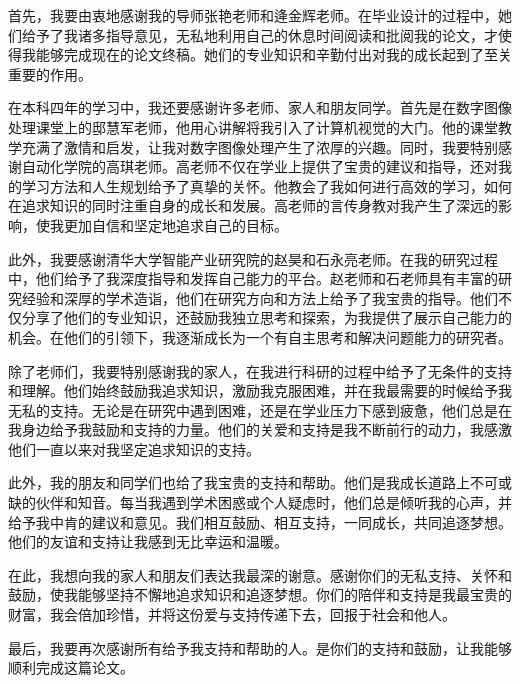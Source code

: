 \begin{acknowledgements}
首先，我要由衷地感谢我的导师张艳老师和逄金辉老师。在毕业设计的过程中，她们给予了我诸多指导意见，无私地利用自己的休息时间阅读和批阅我的论文，才使得我能够完成现在的论文终稿。她们的专业知识和辛勤付出对我的成长起到了至关重要的作用。

在本科四年的学习中，我还要感谢许多老师、家人和朋友同学。首先是在数字图像处理课堂上的邸慧军老师，他用心讲解将我引入了计算机视觉的大门。他的课堂教学充满了激情和启发，让我对数字图像处理产生了浓厚的兴趣。同时，我要特别感谢自动化学院的高琪老师。高老师不仅在学业上提供了宝贵的建议和指导，还对我的学习方法和人生规划给予了真挚的关怀。他教会了我如何进行高效的学习，如何在追求知识的同时注重自身的成长和发展。高老师的言传身教对我产生了深远的影响，使我更加自信和坚定地追求自己的目标。

此外，我要感谢清华大学智能产业研究院的赵昊和石永亮老师。在我的研究过程中，他们给予了我深度指导和发挥自己能力的平台。赵老师和石老师具有丰富的研究经验和深厚的学术造诣，他们在研究方向和方法上给予了我宝贵的指导。他们不仅分享了他们的专业知识，还鼓励我独立思考和探索，为我提供了展示自己能力的机会。在他们的引领下，我逐渐成长为一个有自主思考和解决问题能力的研究者。

除了老师们，我要特别感谢我的家人，在我进行科研的过程中给予了无条件的支持和理解。他们始终鼓励我追求知识，激励我克服困难，并在我最需要的时候给予我无私的支持。无论是在研究中遇到困难，还是在学业压力下感到疲惫，他们总是在我身边给予我鼓励和支持的力量。他们的关爱和支持是我不断前行的动力，我感激他们一直以来对我坚定追求知识的支持。

此外，我的朋友和同学们也给了我宝贵的支持和帮助。他们是我成长道路上不可或缺的伙伴和知音。每当我遇到学术困惑或个人疑虑时，他们总是倾听我的心声，并给予我中肯的建议和意见。我们相互鼓励、相互支持，一同成长，共同追逐梦想。他们的友谊和支持让我感到无比幸运和温暖。

在此，我想向我的家人和朋友们表达我最深的谢意。感谢你们的无私支持、关怀和鼓励，使我能够坚持不懈地追求知识和追逐梦想。你们的陪伴和支持是我最宝贵的财富，我会倍加珍惜，并将这份爱与支持传递下去，回报于社会和他人。

最后，我要再次感谢所有给予我支持和帮助的人。是你们的支持和鼓励，让我能够顺利完成这篇论文。

\end{acknowledgements}
